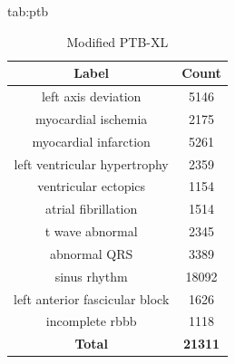 \documentclass[pmlr,twocolumn]{jmlr}%
\begin{document}
\begin{table}[tbp]
\floatconts
  {tab:ptb}%
  {\caption{Modified PTB-XL}}%
  {
    \begin{tabular}{|c|c|}
     \hline
    Label & Count \\
     \hline
        left axis deviation                  &   5146 \\
        myocardial ischemia                  &   2175 \\
        myocardial infarction                &   5261 \\
        left ventricular hypertrophy         &   2359 \\
        ventricular ectopics                 &   1154 \\
        atrial fibrillation                  &   1514 \\
        t wave abnormal                      &   2345 \\
        abnormal QRS                         &   3389 \\
        sinus rhythm                         &  18092 \\
        left anterior fascicular block       &   1626 \\
        incomplete rbbb &   1118 \\
     \hline
    \textbf{Total} & \textbf{21311}\\
    \hline
    \end{tabular}
  }
\end{table}



\label{sec:software}
\end{document}
